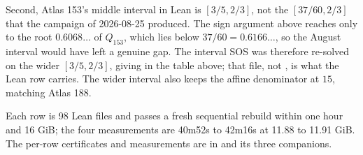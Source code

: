 \documentclass[11pt]{article}
\begin{document}
Second, Atlas 153's middle interval in Lean is $[3/5,2/3]$, not the
$[37/60,2/3]$ that the campaign of 2026-08-25 produced.  The sign argument
above reaches only to the root $0.6068\ldots$ of $Q_{153}$, which lies below
$37/60=0.6166\ldots$, so the August interval would have left a genuine gap.
The interval SOS was therefore re-solved on the wider $[3/5,2/3]$, giving
 in the table above; that file,
not , is what the Lean row
carries.  The wider interval also keeps the affine denominator at $15$, matching
Atlas 188.

Each row is 98 Lean files and passes a fresh sequential rebuild within one
hour and 16 GiB; the four measurements are 40m52s to 42m16s at 11.88 to
11.91 GiB.  The per-row certificates and measurements are in
 and its three companions.
\end{document}
